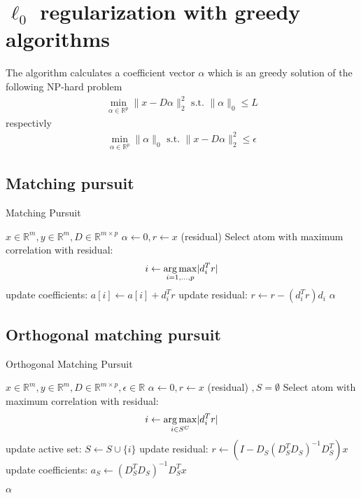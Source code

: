 \section{$\ell_0$ regularization with greedy algorithms}

The algorithm calculates a coefficient vector $\alpha$ which is an greedy solution of the following NP-hard problem
\begin{align}
\min_{\alpha\in\mathbb{R}^{p}}  \lVert x - D\alpha \rVert^{2}_{2} \textrm{ s.t. } \lVert \alpha \rVert_{0} \leq L
\end{align}
respectivly
\begin{align}
\min_{\alpha\in\mathbb{R}^{p}}   \lVert \alpha \rVert_{0}   \textrm{ s.t. } \lVert x - D\alpha \rVert^{2}_{2} \leq \epsilon
\end{align}
\cite{Mallat1993}

\subsection{Matching pursuit}
\label{sec:mp}
\begin{algorithm}
\caption{Matching Pursuit}
\begin{algorithmic}[1]
\REQUIRE $x \in \mathbb{R}^m, y \in \mathbb{R}^m, D \in \mathbb{R}^{m\times p}$
\STATE $\alpha \gets 0, r \gets x $ (residual) 
\STATE Select atom with maximum correlation with residual: 
\begin{equation*}
i \gets \operatorname*{arg\,max}_{i=1,...,p} \lvert d_i^Tr \rvert
\end{equation*}
\STATE update coefficients: $a[i]  \gets a[i] + d_i^Tr$
\STATE update residual: $r \gets r - \left(d_i^Tr\right)d_i$
\ENDWHILE
\RETURN $\alpha$
\end{algorithmic}
\end{algorithm}
\subsection{Orthogonal matching pursuit}
\cite{Pati1993}
\label{sec:omp}


\begin{algorithm}
\caption{Orthogonal Matching Pursuit}
\begin{algorithmic}[1]
\REQUIRE $x \in \mathbb{R}^m, y \in \mathbb{R}^m, D \in \mathbb{R}^{m\times p}, \epsilon \in \mathbb{R}$
\STATE $\alpha \gets 0, r \gets x $ (residual) $, S=\emptyset$
\STATE Select atom with maximum correlation with residual: 
\begin{equation*}
i \gets \operatorname*{arg\,max}_{i \in S^C} \lvert d_i^Tr \rvert
\end{equation*}
\STATE update active set: $S \gets S \cup \{i\} $
\STATE update residual: $r \gets \left(I-D_S\left( D_S^T D_S \right)^{-1} D_S^T \right)x$
\STATE update coefficients: $a_S \gets \left( D_S^T D_S \right)^{-1} D_S^T x $

\ENDFOR
\RETURN $\alpha$
\end{algorithmic}
\end{algorithm}

